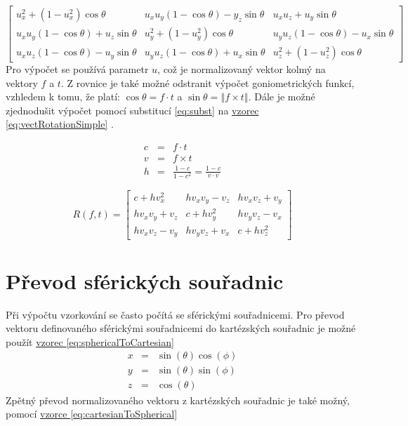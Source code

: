 \documentclass[czech,master]{diploma}
\newcommand{\fromVect}{f}
\newcommand{\toVect}{t}
\begin{document}
\begin{equation} \label{eq:vectRotation}
  \begin{bmatrix}
    u_x^2 + \left ( 1 - u_x^2\right ) \cos\theta                & u_x u_y \left ( 1 - \cos \theta \right ) - y_z \sin \theta & u_x u_z + u_y \sin \theta                                  \\
    u_x u_y \left ( 1 -  \cos \theta \right ) + u_z \sin \theta & u_y^2 + \left ( 1 - u_y^2\right ) \cos\theta               & u_y u_z \left ( 1 - \cos \theta \right ) - u_x \sin \theta \\
    u_x u_z \left ( 1 - \cos \theta \right ) - u_y \sin \theta  & u_y u_z \left ( 1 - \cos \theta \right ) + u_x \sin \theta & u_z^2 + \left ( 1 - u_z^2\right ) \cos\theta
  \end{bmatrix}
\end{equation}
Pro výpočet se používá parametr $u$, což je normalizovaný vektor kolmý na vektory $\fromVect$ a $\toVect$. Z rovnice je také možné odstranit výpočet goniometrických funkcí, vzhledem k tomu, že platí: $\cos \theta = \fromVect \cdot \toVect$ a $\sin \theta = \left\Vert \fromVect \times \toVect \right\Vert$. Dále je možné zjednodušit výpočet pomocí substitucí \hyperref[eq:subst]{\ref{eq:subst}} na \hyperref[eq:vectRotationSimple]{vzorec \ref{eq:vectRotationSimple}} \cite{MollerHughesVectRotation}.

\begin{eqnarray} \label{eq:subst}
  c &=& \fromVect \cdot \toVect \nonumber\\
  v &=& \fromVect \times \toVect \nonumber\\
  h &=& \frac{1 - c}{1 - c^2} = \frac{1 - c}{v \cdot v} \nonumber
\end{eqnarray}

\begin{equation} \label{eq:vectRotationSimple}
  R\left ( \fromVect, \toVect \right) = \begin{bmatrix}
    c + h v_x^2     & h v_x v_y - v_z & h v_x v_z + v_y \\
    h v_x v_y + v_z & c + h v_y^2     & h v_y v_z - v_x \\
    h v_x v_z - v_y & h v_y v_z + v_x & c + h v_z^2
  \end{bmatrix}
\end{equation}

\section{Převod sférických souřadnic}
Při výpočtu vzorkování se často počítá se sférickými souřadnicemi. Pro převod vektoru definovaného sférickými souřadnicemi do kartézských souřadnic je možné použít \hyperref[eq:sphericalToCartesian]{vzorec \ref{eq:sphericalToCartesian}}
\begin{eqnarray}
  x & = & \sin(\theta)\cos(\phi)\nonumber \\
  y & = & \sin(\theta)\sin(\phi)\nonumber \\
  z & = & \cos(\theta)\label{eq:sphericalToCartesian}
\end{eqnarray}
Zpětný převod normalizovaného vektoru z kartézských souřadnic je také možný, pomocí \hyperref[eq:cartesianToSpherical]{vzorce \ref{eq:cartesianToSpherical}}
\end{document}
